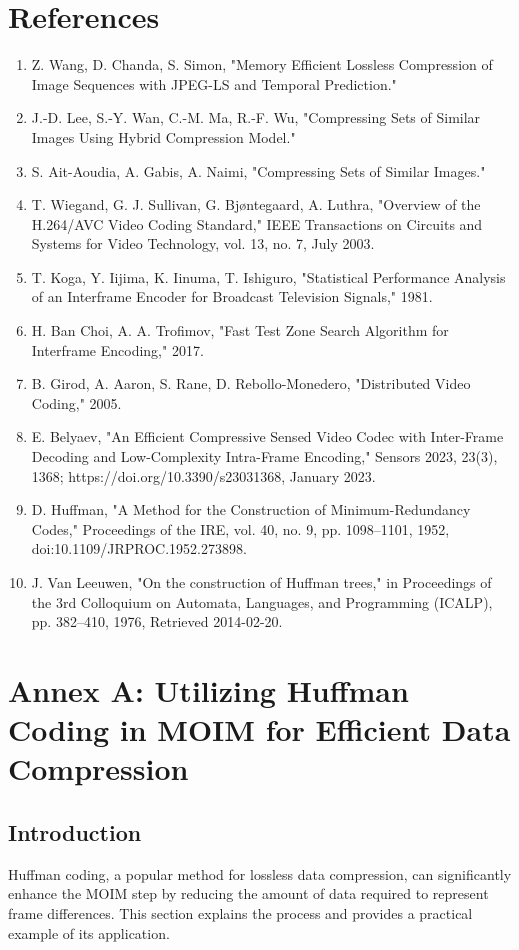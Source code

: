 \documentclass[twocolumn]{article}
\begin{document}
\section{References}
\begin{enumerate}
    \item Z. Wang, D. Chanda, S. Simon, "Memory Efficient Lossless Compression of Image Sequences with JPEG-LS and Temporal Prediction."
    \item J.-D. Lee, S.-Y. Wan, C.-M. Ma, R.-F. Wu, "Compressing Sets of Similar Images Using Hybrid Compression Model."
    \item S. Ait-Aoudia, A. Gabis, A. Naimi, "Compressing Sets of Similar Images."
    \item T. Wiegand, G. J. Sullivan, G. Bjøntegaard, A. Luthra, "Overview of the H.264/AVC Video Coding Standard," IEEE Transactions on Circuits and Systems for Video Technology, vol. 13, no. 7, July 2003.
    \item T. Koga, Y. Iijima, K. Iinuma, T. Ishiguro, "Statistical Performance Analysis of an Interframe Encoder for Broadcast Television Signals," 1981.
    \item H. Ban Choi, A. A. Trofimov, "Fast Test Zone Search Algorithm for Interframe Encoding," 2017.
    \item B. Girod, A. Aaron, S. Rane, D. Rebollo-Monedero, "Distributed Video Coding," 2005.
    \item E. Belyaev, "An Efficient Compressive Sensed Video Codec with Inter-Frame Decoding and Low-Complexity Intra-Frame Encoding," Sensors 2023, 23(3), 1368; https://doi.org/10.3390/s23031368, January 2023.
    \item D. Huffman, "A Method for the Construction of Minimum-Redundancy Codes," Proceedings of the IRE, vol. 40, no. 9, pp. 1098–1101, 1952, doi:10.1109/JRPROC.1952.273898.
    \item J. Van Leeuwen, "On the construction of Huffman trees," in Proceedings of the 3rd Colloquium on Automata, Languages, and Programming (ICALP), pp. 382–410, 1976, Retrieved 2014-02-20.
\end{enumerate}

\clearpage
\newpage
\appendix
\section{Annex A: Utilizing Huffman Coding in MOIM for Efficient Data Compression}
\label{appendix:a}
\subsection{Introduction}
Huffman coding, a popular method for lossless data compression, can significantly enhance the MOIM step by reducing the amount of data required to represent frame differences. This section explains the process and provides a practical example of its application.
\end{document}

